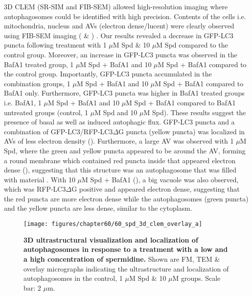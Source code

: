 3D CLEM (SR-SIM and FIB-SEM) allowed high-resolution imaging where autophagosomes could be identified with high precision. Contents of the cells i.e. mitochondria, nucleus and AVs (electron dense/lucent) were clearly observed using FIB-SEM imaging ( \& ) . Our results revealed a decrease in GFP-LC3 puncta following treatment with 1 $\mu$M Spd \& 10 $\mu$M Spd compared to the control group. Moreover, an increase in GFP-LC3 puncta was observed in the BafA1 treated group, 1 $\mu$M Spd + BafA1 and 10 $\mu$M Spd + BafA1 compared to the control group. Importantly, GFP-LC3 puncta accumulated in the combination groups, 1 $\mu$M Spd + BafA1 and 10 $\mu$M Spd + BafA1 compared to BafA1 only. Furthermore, GFP-LC3 puncta was higher in BafA1 treated groups i.e. BafA1, 1 $\mu$M Spd + BafA1 and 10 $\mu$M Spd + BafA1 compared to BafA1 untreated groups (control, 1 $\mu$M Spd and 10 $\mu$M Spd). These results suggest the presence of basal as well as induced autophagic flux. GFP-LC3 puncta and a combination of GFP-LC3/RFP-LC3$\Delta$G puncta (yellow puncta) was localized in AVs of less electron density (). Furthermore, a large AV was observed with 1 $\mu$M Spd, where the green and yellow puncta appeared to be around the AV, forming a round membrane which contained red puncta inside that appeared electron dense (), suggesting that this structure was an autophagosome that was filled with material . With 10 $\mu$M Spd + BafA1 (), a big vacuole was also observed, which was RFP-LC3$\Delta$G positive and appeared electron dense, suggesting that the red puncta are more electron dense while the autophagosomes (green puncta) and the yellow puncta are less dense, similar to the cytoplasm. 

\begin{landscape}
\begin{figure}[!htbp]
\center
 \texttt{[image: figures/chapter60/60\_spd\_3d\_clem\_overlay\_a]}
 \caption[3D ultrastructural visualization and localization of autophagosomes in response to a treatment with a low and a high concentration of spermidine]{\textbf{3D ultrastructural visualization and localization of autophagosomes in response to a treatment with a low and a high concentration of spermidine.} Shown are FM, TEM \& overlay micrographs indicating the ultrastructure and localization of autophagosomes in the control, 1 $\mu$M Spd \& 10 $\mu$M groups. Scale bar: 2 $\mu$m.}
 \label{fig:60_spd_3d_clem_overlay_a}
\end{figure} 
\end{landscape}

